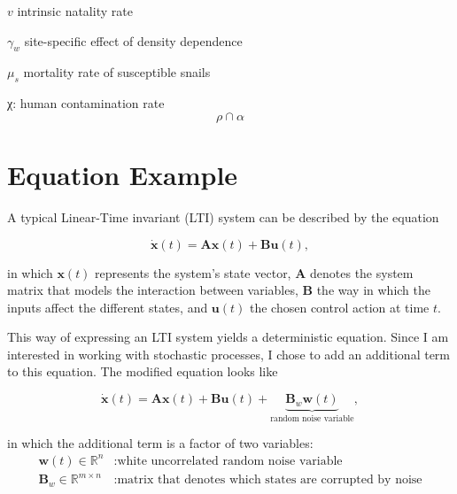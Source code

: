 \documentclass[12pt]{article}
\begin{document}
$v$ intrinsic natality rate

$\gamma_w$ site-specific effect of density dependence

$\mu_s$ mortality rate of susceptible snails







χ: human contamination rate
\begin{equation}
\rho \cap \alpha
\end{equation}


\section{Equation Example}

A typical Linear-Time invariant (LTI) system can be described by the equation

\begin{equation}\label{eq:ltiSys}
\dot{\mathbf{x}}(t) = \mathbf{A} \mathbf{x}(t) + \mathbf{B} \mathbf{u}(t),
\end{equation}

in which ${\mathbf{x}}(t)$ represents the system's state vector, $\mathbf{A}$ denotes the system matrix that models the interaction between variables, $\mathbf{B}$ the way in which the inputs affect the different states, and $\mathbf{u}(t)$ the chosen control action at time $t$.

This way of expressing an LTI system yields a deterministic equation. Since I am interested in working with stochastic processes, I chose to add an additional term to this equation. The modified equation  looks like

\begin{equation}\label{eq:ltiSysStochastic}
\dot{\mathbf{x}}(t) = \mathbf{A} \mathbf{x}(t) + \mathbf{B} \mathbf{u}(t) + \underbrace{ \mathbf{B}_w \mathbf{w}(t)}_{\text{random noise variable}},
\end{equation}

in which the additional term is a factor of two variables:
\begin{align*}
\mathbf{w}(t) \in \mathbb{R}^{n} &: \text{white uncorrelated random noise variable} \\
\mathbf{B}_w \in \mathbb{R}^{m\times n} &: \text{matrix that denotes which states are corrupted by noise}
\end{align*}
\end{document}
